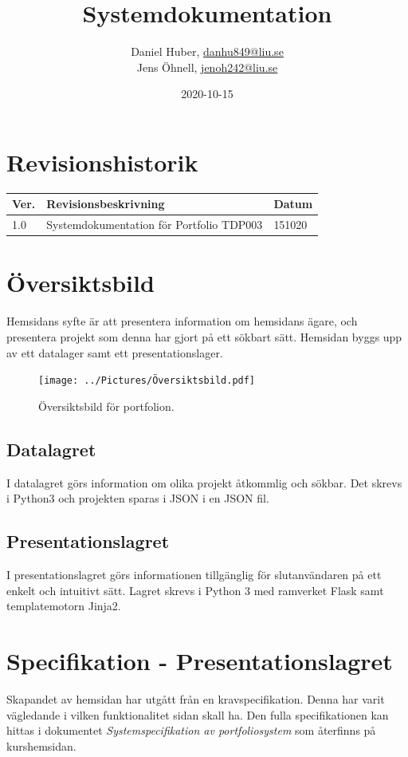 \documentclass{TDP003mall}
\author{Daniel Huber, \url{danhu849@liu.se}\\
  Jens Öhnell, \url{jenoh242@liu.se}}
\title{Systemdokumentation}
\date{2020-10-15}
\begin{document}
\projectpage
\section{Revisionshistorik}
\begin{table}[!h]
\begin{tabularx}{\linewidth}{|l|X|l|}
\hline
Ver. & Revisionsbeskrivning & Datum \\\hline
1.0 & Systemdokumentation för Portfolio TDP003 & 151020 \\\hline
\end{tabularx}
\end{table}


\section{Översiktsbild}
Hemsidans syfte är att presentera information om hemsidans ägare, och presentera projekt som denna har gjort på ett sökbart sätt. Hemsidan byggs upp av ett datalager samt ett presentationslager.
\begin{figure}[h]
  \centerline{\texttt{[image: ../Pictures/Översiktsbild.pdf]}}
  \caption{Översiktsbild för portfolion. \label{fig:1}}
\end{figure}

\subsection{Datalagret}
I datalagret görs information om olika projekt åtkommlig och sökbar. Det skrevs i Python3 och projekten sparas i JSON i en JSON fil.

\subsection{Presentationslagret}
I presentationslagret görs informationen tillgänglig för slutanvändaren på ett enkelt och intuitivt sätt. Lagret skrevs i Python 3 med ramverket Flask samt templatemotorn Jinja2.

\section{Specifikation - Presentationslagret}
Skapandet av hemsidan har utgått från en kravspecifikation. Denna har varit vägledande i vilken funktionalitet sidan skall ha. Den fulla specifikationen kan hittas i dokumentet \textit{Systemspecifikation av portfoliosystem} som återfinns på kurshemsidan.
\end{document}
